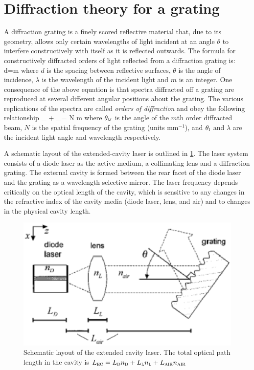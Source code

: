 	\section{Diffraction theory for a grating}\label{gratingtheory}
A diffraction grating is a finely scored reflective material that, due to its geometry, allows only certain wavelengths of light incident at an angle $\theta$ to interfere constructively with itself as it is reflected outwards. The formula for constructively diffracted orders of light reflected from a diffraction grating is:
\mate
d\sin\theta=m\lambda
\atem
where $d$ is the spacing between reflective surfaces, $\theta$ is the angle of incidence, $\lambda$ is the wavelength of the incident light and $m$ is an integer. One consequence of the above equation is that spectra diffracted off a grating are reproduced at several different angular positions about the grating. The various replications of the spectra are called \textit{orders of diffraction} and obey the following relationship 
\mate
\sin\theta_{} + \sin\theta_{}= N m \lambda
\atem
where $\theta_{\mbox{\footnotesize{\scshape{m}}}}$ is the angle of the $m$th order diffracted beam, $N$ is the spatial frequency of the grating (units mm$^{-1}$), and $\theta_{\mbox{\footnotesize{\scshape{i}}}}$ and $\lambda$ are the incident light angle and wavelength respectively.

A schematic layout of the extended-cavity laser is outlined in \cref{grating}. The laser system consists of a diode laser as the active medium, a collimating lens and a diffraction grating. The external cavity is formed between the rear facet of the diode laser and the grating as a wavelength selective mirror. The laser frequency depends critically on the optical length of the cavity, which is sensitive to any changes in the refractive index of the cavity media (diode laser, lens, and air) and to changes in the physical cavity length.

\begin{figure}[!hbt]\centering
\includegraphics[width=\linewidth, draft=\foto]{eps/littrow1.eps}
\caption{Schematic layout of the extended cavity laser. The total optical path length in the cavity is $L_{\mbox{\footnotesize{\scshape{ec}}}}=L_{\mbox{\footnotesize{\scshape{d}}}}n_{\mbox{\footnotesize{\scshape{d}}}}+L_{\mbox{\footnotesize{\scshape{l}}}}n_{\mbox{\footnotesize{\scshape{l}}}}+L_{\mbox{\footnotesize{\scshape{air}}}}n_{\mbox{\footnotesize{\scshape{air}}}}$}
\label{grating}
\end{figure}

